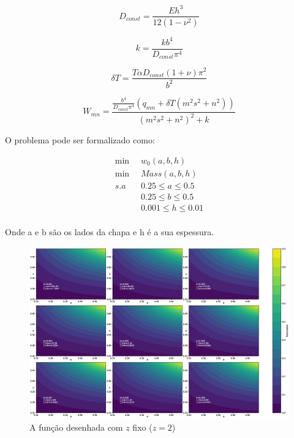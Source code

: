\documentclass[a4paper,12pt]{article}
\begin{document}
\begin{equation}\label{eq:fo}
D_{const}=\frac{E h^3}{12\left(1-{\nu}^2\right)}
\end{equation}

\begin{equation}\label{eq:fo}
k=\frac{k b^4}{D_{const} {\pi}^4}
\end{equation}

\begin{equation}\label{eq:fo}
\delta T=\frac{T \alpha D_{const} \left(1+\nu\right) {\pi}^2}{b^2}
\end{equation}

\begin{equation}\label{eq:fo}
W_{mn}=\frac{\frac{b^4}{D_{const} {\pi}^4} \left(q_{mn}+\delta T \left(m^2 s^2+n^2\right)\right)}{{\left(m^2 s^2+n^2\right)}^2+k}
\end{equation}


O problema pode ser formalizado como:

\begin{equation}\label{eq:prob}
\begin{split}
\min\;\; &w_{0}(a, b, h)\\
\min\;\; &Mass(a, b, h)\\
s.a\;\; & 0.25\leq a\leq 0.5\\
& 0.25\leq b\leq 0.5\\
& 0.001\leq h\leq 0.01\\
\end{split}
\end{equation}

Onde a e b são os lados da chapa e h é a sua espessura.


\begin{figure}[!htbp]
\begin{center}
\includegraphics[scale=0.3]{deformacao.eps}
\end{center}
\caption{\label{fig:defIm}A função desenhada com $z$ fixo ($z=2$)}
\end{figure}
\end{document}

